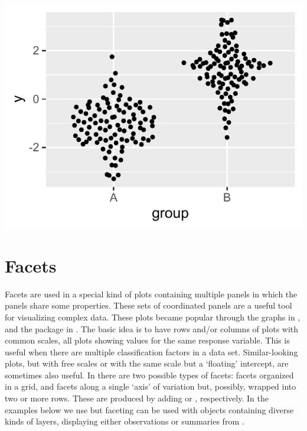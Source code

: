 \documentclass[krantz2]{krantz}\usepackage{knitr}
\begin{document}
\begin{knitrout}\footnotesize
{}\color{fgcolor}\begin{kframe}
\begin{alltt}
  \hlopt{+}
  \hlstd{()}
\end{alltt}
\end{kframe}

{\centering \includegraphics[width=.54\textwidth]{figure/pos-ggbeeswarm-plot-01-1} 

}



\end{knitrout}


\section{Facets}\label{sec:plot:facets}
Facets are used in a special kind of plots containing multiple panels in which the panels share some properties.
These sets of coordinated panels are a useful tool for visualizing complex data. These plots became popular through the  graphs in , and the  package in \Rlang. The basic idea is to have rows and/or columns of plots with common scales, all plots showing values for the same response variable. This is useful when there are multiple classification factors in a data set. Similar-looking plots, but with free scales or with the same scale but a `floating' intercept, are sometimes also useful. In \ggplot there are two possible types of facets: facets organized in a grid, and facets along a single `axis' of variation but, possibly, wrapped into two or more rows. These are produced by adding  or , respectively. In the examples below we use  but faceting can be used with  objects containing diverse kinds of layers, displaying either observations or summaries from .
\end{document}
